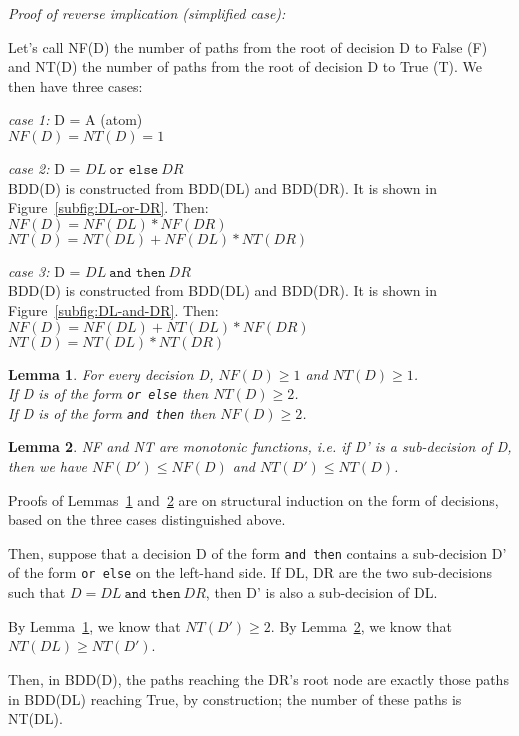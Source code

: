 \documentclass[a4paper,12pt,twoside]{article}
\renewcommand{\le}{\leqslant}
\renewcommand{\ge}{\geqslant}
\newcommand{\andthen}{\texttt{and then}}
\newcommand{\orelse}{\texttt{or else}}
\newtheorem{lemma}{Lemma}[subsection]
\begin{document}
\emph{Proof of reverse implication (simplified case):}

Let's call NF(D) the number of paths from the root of decision D to False (F)
and NT(D) the number of paths from the root of decision D to True (T). We
then have three cases:

\emph{case 1:} D = A (atom)\\
$NF(D) = NT(D) = 1$

\emph{case 2:} D = $DL \ \orelse{} \ DR$\\
BDD(D) is constructed from BDD(DL) and BDD(DR). It is shown
in Figure~\ref{subfig:DL-or-DR}. Then:\\
$NF(D) = NF(DL) * NF(DR)$\\
$NT(D) = NT(DL) + NF(DL) * NT(DR)$

\emph{case 3:} D = $DL \ \andthen{} \ DR$\\
BDD(D) is constructed from BDD(DL) and BDD(DR). It is shown
in Figure~\ref{subfig:DL-and-DR}. Then:\\
$NF(D) = NF(DL) + NT(DL) * NF(DR)$\\
$NT(D) = NT(DL) * NT(DR)$

\begin{lemma}
\label{lemma:NF-NT-bound}
For every decision D, $NF(D) \ge 1$ and $NT(D) \ge 1$.\\
If D is of the form \orelse{} then $NT(D) \ge 2$.\\
If D is of the form \andthen{} then $NF(D) \ge 2$.
\end{lemma}

\begin{lemma}
\label{lemma:NF-NT-monotonic}
NF and NT are monotonic functions, i.e. if D' is a sub-decision of D,
then we have
        $NF(D') \le NF(D)$
and
        $NT(D') \le NT(D)$.
\end{lemma}

Proofs of Lemmas~\ref{lemma:NF-NT-bound} and~\ref{lemma:NF-NT-monotonic} are on
structural induction on the form of decisions, based on the three cases
distinguished above.

Then, suppose that a decision D of the form \andthen{} contains a
sub-decision D' of the form \orelse{} on the left-hand side. If DL, DR
are the two sub-decisions such that $D = DL \ \andthen{} \ DR$, then D' is
also a sub-decision of DL.

By Lemma~\ref{lemma:NF-NT-bound}, we know that $NT(D') \ge 2$. By
Lemma~\ref{lemma:NF-NT-monotonic}, we know that $NT(DL) \ge NT(D')$.

Then, in BDD(D), the paths reaching the DR's root node are exactly
those paths in BDD(DL) reaching True, by construction; the number of
these paths is NT(DL).
\end{document}
